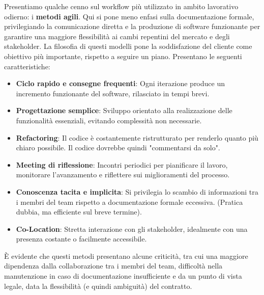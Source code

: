 \noindent Presentiamo qualche cenno sul workflow più utilizzato in ambito lavorativo odierno: i \textbf{metodi agili}. Qui si pone meno enfasi sulla documentazione formale, privilegiando la comunicazione diretta e la produzione di software funzionante per garantire una maggiore flessibilità ai cambi repentini del mercato e degli stakeholder. La filosofia di questi modelli pone la soddisfazione del cliente come obiettivo più importante, rispetto a seguire un piano. Presentano le seguenti caratteristiche: \begin{itemize}
	\item \textbf{Ciclo rapido e consegne frequenti}: Ogni iterazione produce un incremento funzionante del software, rilasciato in tempi brevi.
	\item \textbf{Progettazione semplice}: Sviluppo orientato alla realizzazione delle funzionalità essenziali, evitando complessità non necessarie.
	\item \textbf{Refactoring}: Il codice è costantemente ristrutturato per renderlo quanto più chiaro possibile. Il codice dovrebbe quindi "commentarsi da solo".
	\item \textbf{Meeting di riflessione}: Incontri periodici per pianificare il lavoro, monitorare l'avanzamento e riflettere sui miglioramenti del processo.
	\item \textbf{Conoscenza tacita e implicita}: Si privilegia lo scambio di informazioni tra i membri del team rispetto a documentazione formale eccessiva. (Pratica dubbia, ma efficiente sul breve termine).
	\item \textbf{Co-Location}: Stretta interazione con gli stakeholder, idealmente con una presenza costante o facilmente accessibile.
\end{itemize}
\noindent È evidente che questi metodi presentano alcune criticità, tra cui una maggiore dipendenza dalla collaborazione tra i membri del team, difficoltà nella manutenzione in caso di documentazione insufficiente e da un punto di vista legale, data la flessibilità (e quindi ambiguità) del contratto.